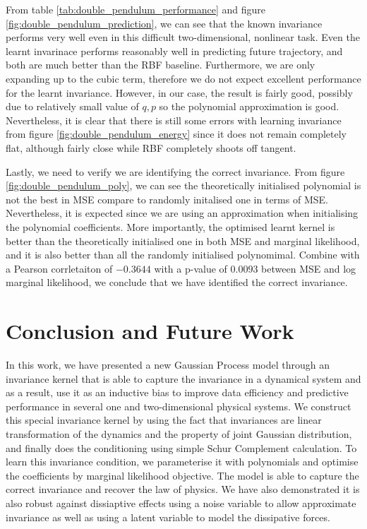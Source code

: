 \documentclass{statsmsc}
\begin{document}
From table \ref{tab:double_pendulum_performance} and figure \ref{fig:double_pendulum_prediction}, we can see that the known invariance performs very well even in this difficult two-dimensional, nonlinear task.
Even the learnt invarinace performs reasonably well in predicting future trajectory, and both are much better than the RBF baseline.
Furthermore, we are only expanding up to the cubic term, therefore we do not expect excellent performance for the learnt invariance.
However, in our case, the result is fairly good, possibly due to relatively small value of $q, p$ so the polynomial approximation is good.
Nevertheless, it is clear that there is still some errors with learning invariance from figure \ref{fig:double_pendulum_energy} since it does not remain completely flat, although fairly close while RBF completely shoots off tangent.

Lastly, we need to verify we are identifying the correct invariance.
From figure \ref{fig:double_pendulum_poly}, we can see the theoretically initialised polynomial is not the best in MSE compare to randomly initalised one in terms of MSE.
Nevertheless, it is expected since we are using an approximation when initialising the polynomial coefficients.
More importantly, the optimised learnt kernel is better than the theoretically initialised one in both MSE and marginal likelihood, and it is also better than all the randomly initialised polynomimal. 
Combine with a Pearson corrletaiton of $-0.3644$ with a p-value of $0.0093$ between MSE and log marginal likelihood, we conclude that we have identified the correct invariance.  

\chapter{Conclusion and Future Work}
In this work, we have presented a new Gaussian Process model through an invariance kernel that is able to capture the invariance in a dynamical system and as a result, use it as an inductive bias to improve data efficiency and predictive performance in several one and two-dimensional physical systems. 
We construct this special invariance kernel by using the fact that invariances are linear transformation of the dynamics and the property of joint Gaussian distribution, and finally does the conditioning using simple Schur Complement calculation.
To learn this invariance condition, we parameterise it with polynomials and optimise the coefficients by marginal likelihood objective. 
The model is able to capture the correct invariance and recover the law of physics.
We have also demonstrated it is also robust against dissiaptive effects using a noise variable to allow approximate invariance as well as using a latent variable to model the dissipative forces. 
\end{document}
